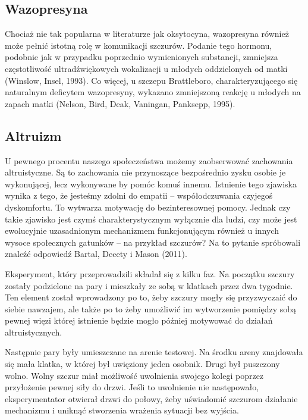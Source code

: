 \documentclass{psychol}
\begin{document}
\subsection{Wazopresyna}

Chociaż nie tak popularna w literaturze jak oksytocyna, wazopresyna również może pełnić istotną rolę w komunikacji szczurów. Podanie tego hormonu, podobnie jak w przypadku poprzednio wymienionych substancji, zmniejsza częstotliwość ultradźwiękowych wokalizacji u młodych oddzielonych od matki (Winslow, Insel, 1993). Co więcej, u szczepu Brattleboro, charakteryzującego się naturalnym deficytem wazopresyny, wykazano zmniejszoną reakcję u młodych na zapach matki (Nelson, Bird, Deak, Vaningan, Panksepp, 1995).


\subsection{Altruizm}

U pewnego procentu naszego społeczeństwa możemy zaobserwować zachowania altruistyczne. Są to zachowania nie przynoszące bezpośrednio zysku osobie je wykonującej, lecz wykonywane by pomóc komuś innemu. Istnienie tego zjawiska wynika z tego, że jesteśmy zdolni do empatii -- współodczuwania czyjegoś dyskomfortu. To wytwarza motywację do bezinteresownej pomocy. Jednak czy takie zjawisko jest czymś charakterystycznym wyłącznie dla ludzi, czy może jest ewolucyjnie uzasadnionym mechanizmem funkcjonującym również u innych wysoce społecznych gatunków -- na przykład szczurów? Na to pytanie spróbowali znaleźć odpowiedź Bartal, Decety i Mason (2011).

Eksperyment, który przeprowadzili składał się z kilku faz. Na początku szczury zostały podzielone na pary i mieszkały ze sobą w klatkach przez dwa tygodnie. Ten element został wprowadzony po to, żeby szczury mogły się przyzwyczaić do siebie nawzajem, ale także po to żeby umożliwić im wytworzenie pomiędzy sobą pewnej więzi której istnienie będzie mogło później motywować do działań altruistycznych.

Następnie pary były umieszczane na arenie testowej. Na środku areny znajdowała się mała klatka, w której był uwięziony jeden osobnik. Drugi był puszczony wolno. Wolny szczur miał możliwość uwolnienia swojego kolegi poprzez przyłożenie pewnej siły do drzwi. Jeśli to uwolnienie nie następowało, eksperymentator otwierał drzwi do połowy, żeby uświadomić szczurom działanie mechanizmu i uniknąć stworzenia wrażenia sytuacji bez wyjścia.
\end{document}
